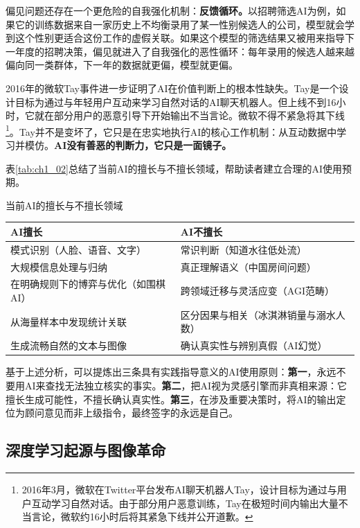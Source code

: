 偏见问题还存在一个更危险的自我强化机制：\textbf{反馈循环。}以招聘筛选AI为例，如果它的训练数据来自一家历史上不均衡录用了某一性别候选人的公司，模型就会学到这个性别更适合这份工作的虚假关联。如果这个模型的筛选结果又被用来指导下一年度的招聘决策，偏见就进入了自我强化的恶性循环：每年录用的候选人越来越偏向同一类群体，下一年的数据就更偏，模型就更偏。

2016年的微软Tay事件进一步证明了AI在价值判断上的根本性缺失。Tay是一个设计目标为通过与年轻用户互动来学习自然对话的AI聊天机器人。但上线不到16小时，它就在部分用户的恶意引导下开始输出不当言论。微软不得不紧急将其下线\footnote{2016年3月，微软在Twitter平台发布AI聊天机器人Tay，设计目标为通过与用户互动学习自然对话。由于部分用户恶意训练，Tay在极短时间内输出大量不当言论，微软约16小时后将其紧急下线并公开道歉。}。Tay并不是变坏了，它只是在忠实地执行AI的核心工作机制：从互动数据中学习并模仿。\textbf{AI没有善恶的判断力，它只是一面镜子。}

表\ref{tab:ch1_02}总结了当前AI的擅长与不擅长领域，帮助读者建立合理的AI使用预期。

\begin{formalTable}
\caption{当前AI的擅长与不擅长领域}
\label{tab:ch1_02}
\begin{tabularx}{\textwidth}{@{}YY@{}}
\toprule
\textbf{AI擅长} & \textbf{AI不擅长} \\
\midrule
模式识别（人脸、语音、文字） & 常识判断（知道水往低处流） \\
大规模信息处理与归纳 & 真正理解语义（中国房间问题） \\
在明确规则下的博弈与优化（如围棋AI） & 跨领域迁移与灵活应变（AGI范畴） \\
从海量样本中发现统计关联 & 区分因果与相关（冰淇淋销量与溺水人数） \\
生成流畅自然的文本与图像 & 确认真实性与辨别真假（AI幻觉） \\
\bottomrule
\end{tabularx}
\end{formalTable}

基于上述分析，可以提炼出三条具有实践指导意义的AI使用原则：\textbf{第一}，永远不要用AI来查找无法独立核实的事实。\textbf{第二}，把AI视为灵感引擎而非真相来源：它擅长生成可能性，不擅长确认真实性。\textbf{第三}，在涉及重要决策时，将AI的输出定位为顾问意见而非上级指令，最终签字的永远是自己。

\subsection{深度学习起源与图像革命}

